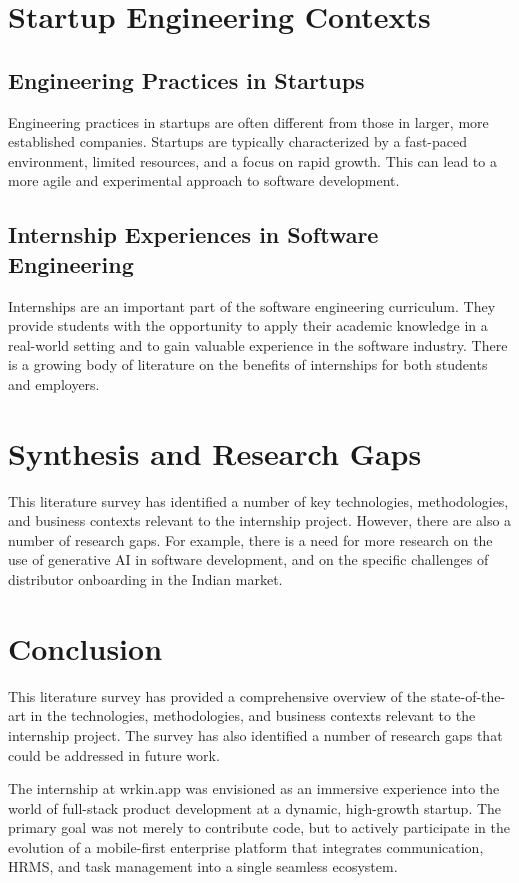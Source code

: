 \section{Startup Engineering Contexts}

\subsection{Engineering Practices in Startups}
Engineering practices in startups are often different from those in larger, more established companies. Startups are typically characterized by a fast-paced environment, limited resources, and a focus on rapid growth. This can lead to a more agile and experimental approach to software development.

\subsection{Internship Experiences in Software Engineering}
Internships are an important part of the software engineering curriculum. They provide students with the opportunity to apply their academic knowledge in a real-world setting and to gain valuable experience in the software industry. There is a growing body of literature on the benefits of internships for both students and employers.

\section{Synthesis and Research Gaps}
This literature survey has identified a number of key technologies, methodologies, and business contexts relevant to the internship project. However, there are also a number of research gaps. For example, there is a need for more research on the use of generative AI in software development, and on the specific challenges of distributor onboarding in the Indian market.

\section{Conclusion}
This literature survey has provided a comprehensive overview of the state-of-the-art in the technologies, methodologies, and business contexts relevant to the internship project. The survey has also identified a number of research gaps that could be addressed in future work.

The internship at wrkin.app was envisioned as an immersive experience into the world of full-stack product development at a dynamic, high-growth startup. The primary goal was not merely to contribute code, but to actively participate in the evolution of a mobile-first enterprise platform that integrates communication, HRMS, and task management into a single seamless ecosystem. 

